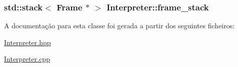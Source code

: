 \subsubsection[{\texorpdfstring{frame\+\_\+stack}{frame_stack}}]{\setlength{\rightskip}{0pt plus 5cm}std\+::stack$<$ {\bf Frame} $\ast$ $>$ Interpreter\+::frame\+\_\+stack\hspace{0.3cm}{\ttfamily [static]}}\hypertarget{class_interpreter_a58a07f0f8a916fdca9cd97fb220c55dc}{}\label{class_interpreter_a58a07f0f8a916fdca9cd97fb220c55dc}


A documentação para esta classe foi gerada a partir dos seguintes ficheiros\+:\begin{DoxyCompactItemize}
\item 
\hyperlink{_interpreter_8hpp}{Interpreter.\+hpp}\item 
\hyperlink{_interpreter_8cpp}{Interpreter.\+cpp}\end{DoxyCompactItemize}
